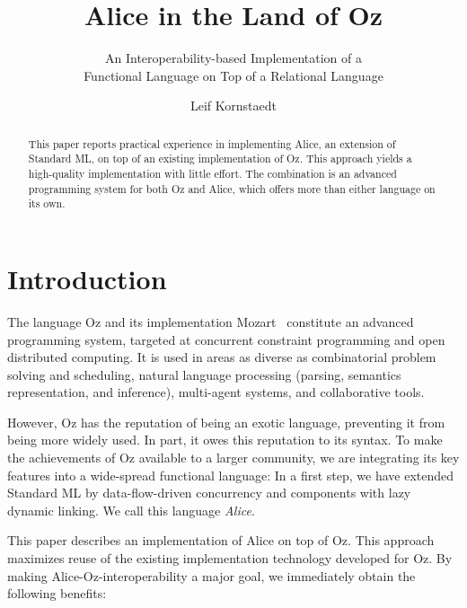 \documentclass{entcs}
\begin{document}
\def\lastname{Kornstaedt}
\begin{frontmatter}
  \title{Alice in the Land of Oz}
  \subtitle{An Interoperability-based Implementation of a \\
    Functional Language on Top of a Relational Language}
  \author{Leif Kornstaedt}
  \address{\href{mailto:kornstae@ps.uni-sb.de}{%
	     \texttt{\normalshape kornstae@ps.uni-sb.de}} \\
	   Programming Systems Lab \\
	   Universit\"{a}t des Saarlandes \\
	   Saarbr\"{u}cken, Germany}
  \begin{abstract}
    This paper reports practical experience in implementing Alice, an
    extension of Standard ML, on top of an existing implementation of Oz.
    This approach yields a high-quality implementation with little effort.
    The combination is an advanced programming system for both Oz and
    Alice, which offers more than either language on its own.
  \end{abstract}
\end{frontmatter}


\section{Introduction}

The language Oz and its implementation Mozart~\cite{Mozart} constitute an
advanced programming system, targeted at concurrent constraint programming and
open distributed computing.  It is used in areas as diverse as combinatorial
problem solving and scheduling, natural language processing (parsing,
semantics representation, and inference), multi-agent systems, and
collaborative tools.

However, Oz has the reputation of being an exotic language, preventing
it from being more widely used.  In part, it owes this reputation to its
syntax.  To make the achievements of Oz available to a larger community,
we are integrating its key features into a wide-spread functional language:
In a first step, we have extended Standard ML by data-flow-driven concurrency
and components with lazy dynamic linking.  We call this language \emph{Alice}.

This paper describes an implementation of Alice on top of Oz.  This approach
maximizes reuse of the existing implementation technology developed for Oz.
By making Alice-Oz-interoperability a major goal, we immediately obtain the
following benefits:
\end{document}
